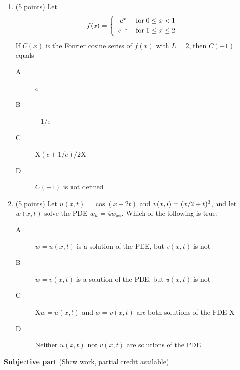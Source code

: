 \documentclass{article}
\begin{document}
\begin{enumerate}
\item (5 points)  Let
\[
f(x)=\left\{
\begin{array}{cl}
e\sp{x} & \hbox{for $0\le x<1$}\smallskip\\
e\sp{-x} & \hbox{for $1\le x\le 2$}
\end{array}
\right.
\]
If $C(x)$ is the Fourier cosine series of $f(x)$ with $L=2$, then $C(-1)$ equals
\begin{description}
\item[A] $e$
\item[B] $-1/e$
\item[C] X$(e+1/e)/2$X
\item[D] $C(-1)$ is not defined
\end{description}

\bigskip
\item (5 points) Let $u(x,t)=\cos(x-2t)$ and $v(x,t)=(x/2+t)\sp3$, and let $w(x,t)$ solve the PDE $w_{tt}=4w_{xx}$.  Which of the following is true:
\begin{description}
\item[A] $w=u(x,t)$ is a solution of the PDE, but $v(x,t)$ is not
\item[B] $w=v(x,t)$ is a solution of the PDE, but $u(x,t)$ is not
\item[C] X$w=u(x,t)$ and $w=v(x,t)$ are both solutions of the PDE X
\item[D] Neither $u(x,t)$ nor $v(x,t)$ are solutions of the PDE
\end{description}


\end{enumerate}

\bigskip\bigskip\noindent
{\bf Subjective part} (Show work, partial credit available)
\end{document}
